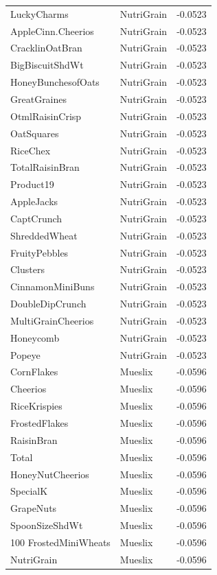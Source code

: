\begin{longtable}{llr}
LuckyCharms & NutriGrain & -0.0523 \\
AppleCinn.Cheerios & NutriGrain & -0.0523 \\
CracklinOatBran & NutriGrain & -0.0523 \\
BigBiscuitShdWt & NutriGrain & -0.0523 \\
HoneyBunchesofOats & NutriGrain & -0.0523 \\
GreatGraines & NutriGrain & -0.0523 \\
OtmlRaisinCrisp & NutriGrain & -0.0523 \\
OatSquares & NutriGrain & -0.0523 \\
RiceChex & NutriGrain & -0.0523 \\
TotalRaisinBran & NutriGrain & -0.0523 \\
Product19 & NutriGrain & -0.0523 \\
AppleJacks & NutriGrain & -0.0523 \\
CaptCrunch & NutriGrain & -0.0523 \\
ShreddedWheat & NutriGrain & -0.0523 \\
FruityPebbles & NutriGrain & -0.0523 \\
Clusters & NutriGrain & -0.0523 \\
CinnamonMiniBuns & NutriGrain & -0.0523 \\
DoubleDipCrunch & NutriGrain & -0.0523 \\
MultiGrainCheerios & NutriGrain & -0.0523 \\
Honeycomb & NutriGrain & -0.0523 \\
Popeye & NutriGrain & -0.0523 \\
CornFlakes & Mueslix & -0.0596 \\
Cheerios & Mueslix & -0.0596 \\
RiceKrispies & Mueslix & -0.0596 \\
FrostedFlakes & Mueslix & -0.0596 \\
RaisinBran & Mueslix & -0.0596 \\
Total & Mueslix & -0.0596 \\
HoneyNutCheerios & Mueslix & -0.0596 \\
SpecialK & Mueslix & -0.0596 \\
GrapeNuts & Mueslix & -0.0596 \\
SpoonSizeShdWt & Mueslix & -0.0596 \\
100%
FrostedMiniWheats & Mueslix & -0.0596 \\
NutriGrain & Mueslix & -0.0596 \\

\end{longtable}
